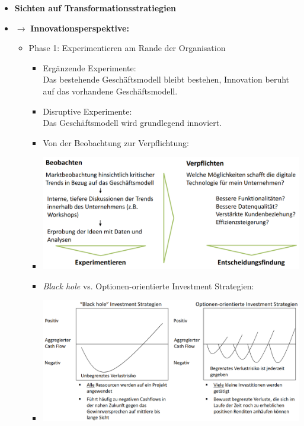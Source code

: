 \documentclass[12pt,a4paper]{article}
\begin{document}
\begin{itemize}
   \item \textbf{Sichten auf Transformationsstratiegien}

   \item[] $\rightarrow$ \textbf{Innovationsperspektive:}
      \begin{itemize}
         \item Phase 1: Experimentieren am Rande der Organisation
               \begin{itemize}
                  \item Ergänzende Experimente: \\
                        Das bestehende Geschäftsmodell bleibt bestehen, Innovation beruht auf das vorhandene Geschäftsmodell.
                  \item Disruptive Experimente: \\
                        Das Geschäftsmodell wird grundlegend innoviert.
                  \item Von der Beobachtung zur Verpflichtung:
                  \item[] \includegraphics[scale=0.45]{experiment.png}
                  \item \emph{Black hole} vs. Optionen-orientierte Investment Strategien:
                  \item[] \includegraphics[scale=0.4]{bh.png}
               \end{itemize}


\end{itemize}
\end{itemize}
\end{document}
